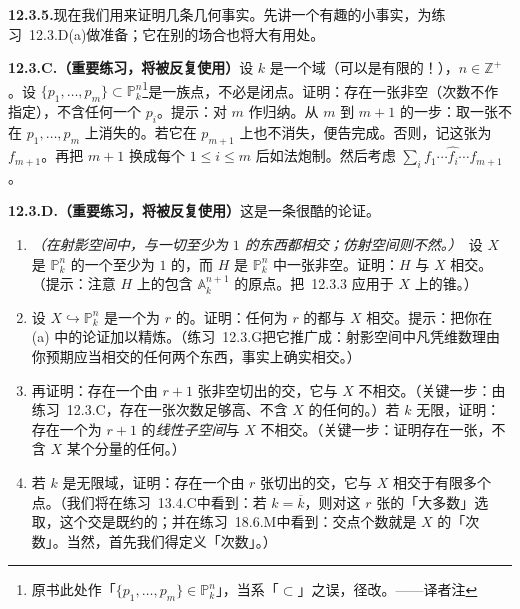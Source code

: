 \textbf{12.3.5.}\quad 现在我们用\trKrull{}\trPrincipalIdealTheorem{}来证明几条几何事实。先讲一个有趣的小事实，为\mbox{练习~12.3.D(a)}做准备；它在别的场合也将大有用处。

\textbf{12.3.C.（重要练习，将被反复使用）}\quad 设 $k$ 是一个域（可以是有限的！），$n\in\mathbb{Z}^+$。设 $\{p_1,\dots,p_m\}\subset\mathbb{P}^n_k$\footnote{原书此处作「$\{p_1,\dots,p_m\}\in\mathbb{P}^n_k$」，当系「$\subset$」之误，径改。——译者注}是一族点，不必是闭点。证明：存在一张非空\trHypersurface（次数不作指定），不含任何一个 $p_i$。提示：对 $m$ 作归纳。从 $m$ 到 $m+1$ 的一步：取一张不在 $p_1,\dots,p_m$ 上消失的\trHypersurface。若它在 $p_{m+1}$ 上也不消失，便告完成。否则，记这张\trHypersurface{}为 $f_{m+1}$。再把 $m+1$ 换成每个 $1\le i\le m$ 后如法炮制。然后考虑 $\sum_i f_1\cdots\widehat{f_i}\cdots f_{m+1}$。

\textbf{12.3.D.（重要练习，将被反复使用）}\quad 这是一条很酷的论证。
\begin{enumerate}[label=(\alph*)]
\item \emph{（在射影空间中，\trHypersurface{}与一切\trDimension{}至少为 $1$ 的东西都相交；仿射空间则不然。）}\ 设 $X$ 是 $\mathbb{P}^n_k$ 的一个\trDimension{}至少为 $1$ 的\trClosedSubset，而 $H$ 是 $\mathbb{P}^n_k$ 中一张非空\trHypersurface。证明：$H$ 与 $X$ 相交。（提示：注意 $H$ 上的\trAffine\trCone{}包含 $\mathbb{A}^{n+1}_k$ 的原点。把\trKrull{}\trPrincipalIdealTheorem~12.3.3 应用于 $X$ 上的锥。）
\item 设 $X\hookrightarrow\mathbb{P}^n_k$ 是一个\trDimension{}为 $r$ 的\trClosedSubset。证明：任何\trCodimension{}为 $r$ 的\trLinearSpace{}都与 $X$ 相交。提示：把你在 (a) 中的论证加以精炼。（\mbox{练习~12.3.G}把它推广成：射影空间中凡凭维数理由你预期应当相交的任何两个东西，事实上确实相交。）
\item 再证明：存在一个由 $r+1$ 张非空\trHypersurface{}切出的交，它与 $X$ 不相交。（关键一步：由\mbox{练习~12.3.C}，存在一张次数足够高、不含 $X$ 的任何\trGenericPoint{}的\trHypersurface。）若 $k$ 无限，证明：存在一个\trCodimension{}为 $r+1$ 的\emph{线性子空间}与 $X$ 不相交。（关键一步：证明存在一张\trHyperplane，不含 $X$ 某个分量的任何\trGenericPoint。）
\item 若 $k$ 是无限域，证明：存在一个由 $r$ 张\trHyperplane{}切出的交，它与 $X$ 相交于有限多个点。（我们将在\mbox{练习~13.4.C}中看到：若 $k=\overline{k}$，则对这 $r$ 张\trHyperplane{}的「大多数」选取，这个交是既约的；并在\mbox{练习~18.6.M}中看到：交点个数就是 $X$ 的「次数」。当然，首先我们得定义「次数」。）
\end{enumerate}

